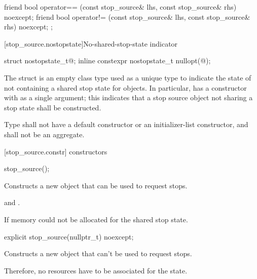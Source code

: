 {\begin{codeblock}
{{    friend bool operator== (const stop_source& lhs, const stop_source& rhs) noexcept;
    friend bool operator!= (const stop_source& lhs, const stop_source& rhs) noexcept;
  };
}
\end{codeblock}

[stop_source.nostopstate]{No-shared-stop-state indicator}

%
%
\begin{itemdecl}
struct nostopstate_t{@\seebelow@};
inline constexpr nostopstate_t nullopt(@\unspec@);
\end{itemdecl}

\pnum
The struct  is an empty class type used as a unique type to indicate the state of
not containing a shared stop state for  objects.
In particular,  has a constructor with  as a single argument;
this indicates that a stop source object not sharing a stop state shall be constructed.

\pnum
Type  shall not have a default constructor or an initializer-list constructor, and shall not be an aggregate.

[stop_source.constr]{ constructors}

%
\begin{itemdecl}
stop_source();
\end{itemdecl}
\begin{itemdescr}
  \pnum\effects Constructs a new  object that can be used to request stops.
  
  \pnum\postconditions {} and .

  \pnum\throws {} If memory could not be allocated for the shared stop state.
\end{itemdescr}

%
\begin{itemdecl}
explicit stop_source(nullptr_t) noexcept;
\end{itemdecl}
\begin{itemdescr}
  \pnum\effects Constructs a new  object that can't be used to request stops.
                \begin{note} Therefore, no resources have to be associated for the state.  \end{note}


\end{itemdescr}}
